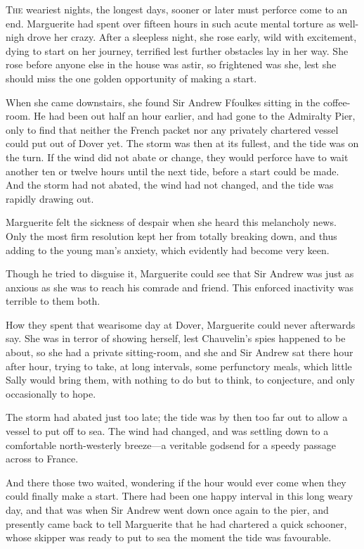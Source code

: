 \documentclass[paper=a5,BCOR=7mm,twoside,DIV=calc,12pt,usegeometry,chapterprefix,endperiod,headings=big]{scrbook}
\begin{document}
\lettrine[lines=4]{T}{he} weariest nights, the longest days, sooner or later must perforce come to an end. Marguerite had spent over fifteen hours in such acute mental torture as well-nigh drove her crazy. After a sleepless night, she rose early, wild with excitement, dying to start on her journey, terrified lest further obstacles lay in her way. She rose before anyone else in the house was astir, so frightened was she, lest she should miss the one golden opportunity of making a start.

When she came downstairs, she found Sir Andrew  Ffoulkes sitting in the coffee-room. He had been out half an hour earlier, and had gone to the Admiralty Pier, only to find that neither the French packet nor any privately chartered vessel could put out of Dover yet. The storm was then at its fullest, and the tide was on the turn. If the wind did not abate or change, they would perforce have to wait another ten or twelve hours until the next tide, before a start could be made. And the storm had not abated, the wind had not changed, and the tide was rapidly drawing out.

Marguerite felt the sickness of despair when she heard this melancholy news. Only the most firm resolution kept her from totally breaking down, and thus adding to the young man's anxiety, which evidently had become very keen.

Though he tried to disguise it, Marguerite could see that Sir Andrew was just as anxious as she was to reach his comrade and friend. This enforced inactivity was terrible to them both.

How they spent that wearisome day at Dover, Marguerite could never afterwards say. She was in terror of showing herself, lest Chauvelin's spies happened to be about, so she had a private sitting-room, and she and Sir Andrew sat there hour after hour, trying to take, at long intervals, some perfunctory meals, which little Sally would bring them, with nothing to do but to think, to conjecture, and only occasionally to hope.

The storm had abated just too late; the tide was by then too far out to allow a vessel to put off to sea. The wind had changed, and was settling down to a comfortable north-westerly breeze---a veritable godsend for a  speedy passage across to France.

And there those two waited, wondering if the hour would ever come when they could finally make a start. There had been one happy interval in this long weary day, and that was when Sir Andrew went down once again to the pier, and presently came back to tell Marguerite that he had chartered a quick schooner, whose skipper was ready to put to sea the moment the tide was favourable.
\end{document}
